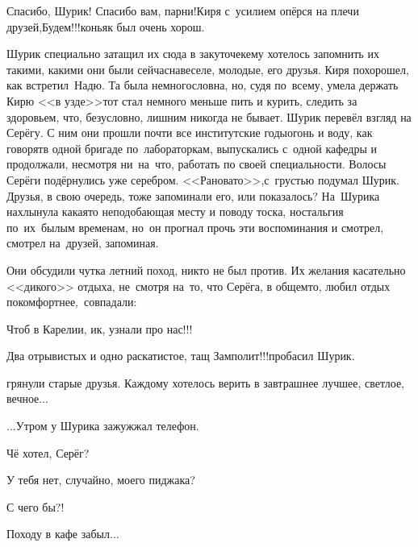 {\diagdash Спасибо, Шурик! Спасибо вам, парни!\mdash Киря с~усилием опёрся на плечи друзей,\mdash Будем!!!\mdash коньяк был очень хорош.

Шурик специально затащил их сюда в закуточек\mdash ему хотелось запомнить их такими, какими они были сейчас\mdash навеселе, молодые, его друзья. Киря похорошел, как встретил~Надю. Та была немногословна, но, судя по~всему, умела держать Кирю <<в узде>>\mdash тот стал немного меньше пить и курить, следить за здоровьем, что, безусловно, лишним никогда не бывает. Шурик перевёл взгляд на Серёгу. С ним они прошли почти все институтские годы\mdash огонь и воду, как говорят\mdash в одной бригаде по~лабораторкам, выпускались с~одной кафедры и продолжали, несмотря ни~на~что, работать по своей специальности. Волосы Серёги подёрнулись уже серебром. <<Рановато>>,\mdash с~грустью подумал Шурик. Друзья, в свою очередь, тоже запоминали его, или показалось? На~Шурика нахлынула какая\sdash то неподобающая месту и поводу тоска, ностальгия по~их~былым временам, но~он прогнал прочь эти воспоминания и смотрел, смотрел на~друзей, запоминая.  

Они обсудили чутка летний поход, никто не был против. Их желания касательно <<дикого>> отдыха, не~смотря на~то, что Серёга, в общем\sdash то, любил отдых покомфортнее,~совпадали:

\diagdash Чтоб в Карелии, ик, узнали про нас!!!%

\diagdash Два отрывистых и одно раскатистое, тащ Замполит!!!\mdash пробасил Шурик.

\mdash грянули старые друзья. Каждому хотелось верить в завтрашнее лучшее, светлое, вечное$\ldots$

\vspace{2.0cm}
$\ldots$Утром у Шурика зажужжал телефон. 

\diagdash Чё хотел, Серёг?

\diagdash У тебя нет, случайно, моего пиджака?

\diagdash С чего бы?!

\diagdash Походу в кафе забыл$\ldots$

\begin{center}
\end{center}
}